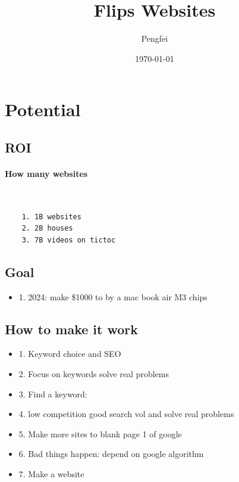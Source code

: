 \documentclass[12pt]{article}
\begin{document}
\title{Flips Websites}
\author{Pengfei}
\date{\today}
\maketitle

\tableofcontents

\section{Potential}
\subsection{ROI}
\paragraph{How many websites}~\\
\begin{verbatim}
    1. 1B websites
    2. 2B houses
    3. 7B videos on tictoc
\end{verbatim}

\subsection{Goal}
\begin{itemize}
    \item 1. 2024: make \$1000 to by a mac book air M3 chips
\end{itemize}

\subsection{How to make it work}
\begin{itemize}
    \item 1. Keyword choice and SEO
    \item 2. Focus on keywords solve real problems
    \item 3. Find a keyword:
    \item 4. low competition good search vol and solve real problems
    \item 5. Make more sites to blank page 1 of google
    \item 6. Bad things happen: depend on google algorithm
    \item 7. Make a website
\end{itemize}
\end{document}
